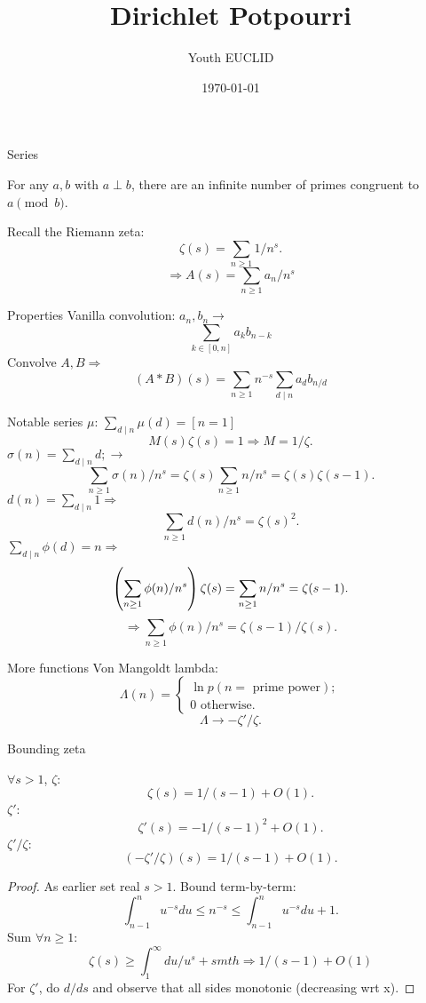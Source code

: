 \documentclass{xuan}
\title{Dirichlet Potpourri}
\author{Youth EUCLID}
\date\today
\begin{document}
\maketitle
\begin{frame}{Series}
\begin{pt}
For any $a,b$ with $a\perp b$, there are an infinite number of primes congruent to $a\pmod{b}$.
\end{pt}
Recall the Riemann zeta:
\[\zeta(s)=\sum_{n\ge1}1/n^s.\]
\[\Rightarrow A(s)=\sum_{n\ge1}a_n/n^s\]
\end{frame}
\begin{frame}{Properties}
Vanilla convolution: $a_n,b_n\to$
\[\sum_{k\in[0,n]}a_kb_{n-k}\] 
Convolve $A,B\Rightarrow$
\[(A*B)(s)=\sum_{n\ge1}n^{-s}\sum_{d\mid n}a_db_{n/d}\]
\end{frame}
\begin{frame}{Notable series}
$\mu$: $\sum_{d\mid n}\mu(d)=[n=1]$
\[M(s)\zeta(s)=1\Rightarrow M=1/\zeta.\]
$\sigma(n)=\sum_{d\mid n}d;\to$
\[\sum_{n\ge1}\sigma(n)/n^s=\zeta(s)\sum_{n\ge1}n/n^s=\zeta(s)\zeta(s-1).\]
$d(n)=\sum_{d\mid n}1\Rightarrow$
\[\sum_{n\ge1}d(n)/n^s=\zeta(s)^2.\]
$\sum_{d\mid n}\phi(d)=n\Rightarrow$
\[\left( \sum_{n\ge1}\phi(n)/n^s\right)\zeta(s)=\sum_{n\ge1}n/n^s=\zeta(s-1).\]
\[\Rightarrow \sum_{n\ge1}\phi(n)/n^s=\zeta(s-1)/\zeta(s).\]
\end{frame}
\begin{frame}{More functions	}
Von Mangoldt lambda:
\[\Lambda(n)=
\begin{cases}
\ln p (n=\text{ prime power});\\
0\text{ otherwise.	}
\end{cases}\]
\[\Lambda\to-\zeta '/\zeta.\]
\end{frame}
\begin{frame}{Bounding zeta}
\begin{pt}
$\forall s>1$,
$\zeta$:
\[\zeta(s)=1/(s-1)+O(1).\]
$\zeta'$:
\[\zeta'(s)=-1/(s-1)^2+O(1).\]
$\zeta'/\zeta$:
\[(-\zeta'/\zeta) (s)=1/(s-1)+O(1).\]
\end{pt}
\begin{proof}
As earlier set real $s>1$.
Bound term-by-term:
\[\int_{n-1}^nu^{-s}du\le n^{-s}\le\int_{n-1}^nu^{-s}du+1.\]
Sum $\forall n\ge1$:
\[\zeta(s)\ge \int_1^\infty du/u^s+ smth\Rightarrow 1/(s-1)+O(1)\]
For $\zeta'$, do $d/ds$ and observe that all sides monotonic (decreasing wrt x).
\end{proof}
\end{frame}
\end{document}
